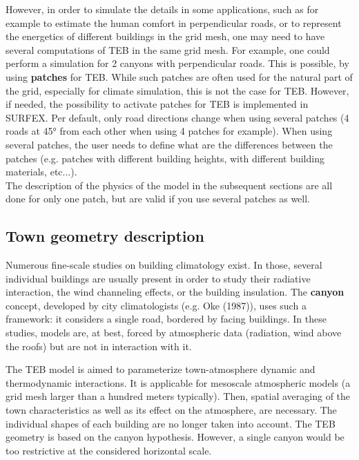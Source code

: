 However, in order to simulate the details in some applications, such as for example to estimate the human comfort in perpendicular roads, or to represent the energetics of different buildings in the grid mesh, one may need to have several computations of TEB in the same grid mesh. For example, one could perform a simulation for 2 canyons with perpendicular roads. This is possible, by using {\bf patches} for TEB. While such patches are often used for the natural part of the grid, especially for climate simulation, this is not the case for TEB. However, if needed, the possibility to activate patches for TEB is implemented in SURFEX. Per default, only road directions change when using several patches (4 roads at 45° from each other when using 4 patches for example). When using several patches, the user needs to define what are the differences between the patches (e.g. patches with different building heights, with different building materials, etc...). \\

The description of the physics of the model in the subsequent sections are all done for only one patch, but are valid if you use several patches as well. \\


\subsection{Town geometry description}

Numerous fine-scale studies on building climatology exist.
In those, several individual buildings are usually
present in order to study their radiative interaction,
the wind channeling effects, or the building insulation.
The {\bf canyon} concept, developed by city climatologists
(e.g. Oke (1987)\nocite{Oke1987a}), uses such a framework:
it considers a single road, bordered by facing buildings.
In these studies, models are, at best, forced by atmospheric
data (radiation, wind
above the roofs) but are not in interaction with it.

The TEB model is aimed to parameterize town-atmosphere 
dynamic and thermodynamic interactions. It is applicable for mesoscale
atmospheric models (a grid mesh larger than a hundred meters typically).
Then, spatial
averaging of the town characteristics as well as its effect on the atmosphere,
are necessary.
The individual shapes
of each building are no longer taken into account. 
The TEB geometry is based on the canyon hypothesis. However, a
single canyon would be too restrictive at the 
considered horizontal scale.

